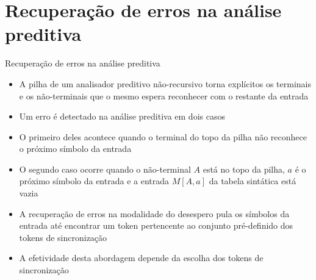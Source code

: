 \section{Recuperação de erros na análise preditiva}

\begin{frame}[fragile]{Recuperação de erros na análise preditiva}

    \begin{itemize}
        \item A pilha de um analisador preditivo não-recursivo torna explícitos os terminais e os não-terminais que o mesmo espera reconhecer com o restante
            da entrada
        \pause

        \item Um erro é detectado na análise preditiva em dois casos
        \pause

        \item O primeiro deles acontece quando o terminal do topo da pilha não reconhece o próximo símbolo da entrada
        \pause

        \item O segundo caso ocorre quando o não-terminal $A$ está no topo da pilha, $a$ é o próximo símbolo da entrada e a entrada $M[A, a]$ da tabela sintática
            está vazia
        \pause

        \item A recuperação de erros na modalidade do desespero pula os símbolos da entrada até encontrar um token pertencente ao conjunto pré-definido dos
            tokens de sincronização
        \pause

        \item A efetividade desta abordagem depende da escolha dos tokens de sincronização
    \end{itemize}

\end{frame}
